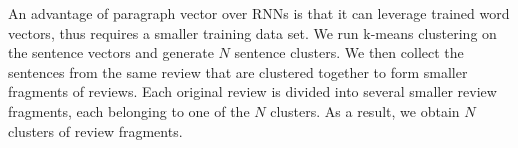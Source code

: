 \documentclass[10pt,final,conference,letterpaper]{IEEEtran}
\begin{document}
%
An advantage of paragraph vector over RNNs is that it can 
leverage trained word vectors, thus requires a smaller training data set. 
We run k-means clustering on the sentence vectors and generate 
$N$ sentence clusters. We then collect the sentences from the same review 
that are clustered together to form smaller fragments of reviews. 
Each original review is divided into several smaller review fragments, 
each belonging to one of the $N$ clusters. As a result, we obtain $N$ 
clusters of review fragments. 
\end{document}
